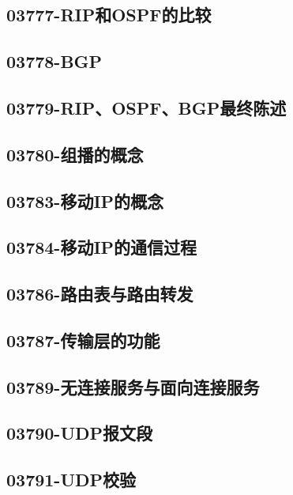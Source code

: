 \subsection{03777-RIP和OSPF的比较}

\subsection{03778-BGP}

\subsection{03779-RIP、OSPF、BGP最终陈述}

\subsection{03780-组播的概念}

\subsection{03783-移动IP的概念}

\subsection{03784-移动IP的通信过程}

\subsection{03786-路由表与路由转发}

\subsection{03787-传输层的功能}

\subsection{03789-无连接服务与面向连接服务}

\subsection{03790-UDP报文段}

\subsection{03791-UDP校验}

